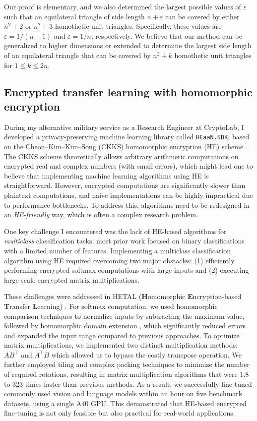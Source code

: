 \documentclass[letterpaper, 10pt]{article}
\begin{document}
Our proof is elementary, and we also determined the largest possible values of $\varepsilon$ such that an equilateral triangle of side length $n + \varepsilon$ can be covered by either $n^2 + 2$ or $n^2 + 3$  homothetic unit triangles.
Specifically, these values are $\varepsilon= 1 / (n + 1)$ and $\varepsilon = 1 / n$, respectively.
We believe that our method can be generalized to higher dimensions or extended to determine the largest side length of an equilateral triangle that can be covered by $n^2 + k$ homothetic unit triangles for $1 \le k \le 2n$.


\subsection{Encrypted transfer learning with homomorphic encryption}

During my alternative military service as a Research Engineer at CryptoLab, I developed a privacy-preserving machine learning library called \texttt{HEaaN.SDK}, based on the Cheon--Kim--Kim--Song (CKKS) homomorphic encryption (HE) scheme \cite{cheon2017homomorphic}.
The CKKS scheme theoretically allows arbitrary arithmetic computations on encrypted real and complex numbers (with small errors), which might lead one to believe that implementing machine learning algorithms using HE is straightforward.
However, encrypted computations are significantly slower than plaintext computations, and naive implementations can be highly impractical due to performance bottlenecks.
To address this, algorithms need to be redesigned in an \emph{HE-friendly} way, which is often a complex research problem.

One key challenge I encountered was the lack of HE-based algorithms for \emph{multiclass} classification tasks; most prior work focused on binary classifications with a limited number of features.
Implementing a multiclass classification algorithm using HE required overcoming two major obstacles: (1) efficiently performing encrypted softmax computations with large inputs and (2) executing large-scale encrypted matrix multiplications.

These challenges were addressed in HETAL (\textbf{H}omomorphic \textbf{E}ncryption-based \textbf{T}ransfer \textbf{L}earning) \cite{lee2023hetal}. 
For softmax computation, we used homomorphic comparison techniques \cite{cheon2020efficient} to normalize inputs by subtracting the maximum value, followed by homomorphic domain extension \cite{cheon2022efficient}, which significantly reduced errors and expanded the input range compared to previous approaches.
To optimize matrix multiplications, we implemented two distinct multiplication methods: $AB^\intercal$ and $A^\intercal B$ which allowed us to bypass the costly transpose operation.
We further employed tiling and complex packing techniques to minimize the number of required rotations, resulting in matrix multiplication algorithms that were 1.8 to 323 times faster than previous methods.
As a result, we successfully fine-tuned commonly used vision and language models within an hour on five benchmark datasets, using a single A40 GPU. 
This demonstrated that HE-based encrypted fine-tuning is not only feasible but also practical for real-world applications.




{
\scriptsize
}
\end{document}
